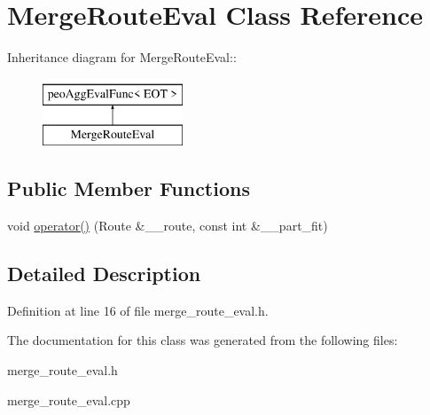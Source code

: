 \hypertarget{classMergeRouteEval}{
\section{Merge\-Route\-Eval Class Reference}
\label{classMergeRouteEval}
}
Inheritance diagram for Merge\-Route\-Eval::\begin{figure}[H]
\begin{center}
\leavevmode
\includegraphics[height=2cm]{classMergeRouteEval}
\end{center}
\end{figure}
\subsection*{Public Member Functions}
\begin{CompactItemize}
\item 
\hypertarget{classMergeRouteEval_29cb0028ac0df4b2cee3a809c8f35dea}{
void \hyperlink{classMergeRouteEval_29cb0028ac0df4b2cee3a809c8f35dea}{operator()} (Route \&\_\-\_\-route, const int \&\_\-\_\-part\_\-fit)}
\label{classMergeRouteEval_29cb0028ac0df4b2cee3a809c8f35dea}

\end{CompactItemize}


\subsection{Detailed Description}




Definition at line 16 of file merge\_\-route\_\-eval.h.

The documentation for this class was generated from the following files:\begin{CompactItemize}
\item 
merge\_\-route\_\-eval.h\item 
merge\_\-route\_\-eval.cpp\end{CompactItemize}
